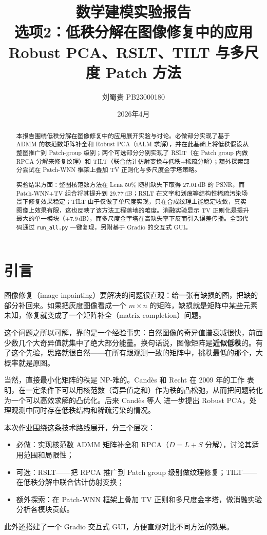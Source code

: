 \documentclass[10.5pt, a4paper]{article}
\title{%
    \vspace{-1cm}
    \textbf{数学建模实验报告} \\[0.3cm]
    \Large 选项2：低秩分解在图像修复中的应用 \\[0.2cm]
    \large Robust PCA、RSLT、TILT 与多尺度 Patch 方法
}
\author{刘蜀贵 \quad PB23000180}
\date{2026年4月}
\begin{document}
\maketitle

\begin{abstract}
本报告围绕低秩分解在图像修复中的应用展开实验与讨论。必做部分实现了基于 ADMM 的核范数矩阵补全和 Robust PCA（iALM 求解），并在此基础上将低秩假设从整图推广到 Patch-group 级别；两个可选部分分别实现了 RSLT（在 Patch group 内做 RPCA 分解来修复纹理）和 TILT（联合估计仿射变换与低秩+稀疏分解）；额外探索部分尝试在 Patch-WNN 框架上叠加 TV 正则化与多尺度金字塔策略。

实验结果方面：整图核范数方法在 Lena 50\% 随机缺失下取得 27.01\,dB 的 PSNR，而 Patch-WNN+TV 组合将其提升到 29.77\,dB；RSLT 在文字和划痕等结构性稀疏污染场景下修复效果稳定；TILT 由于仅做了单尺度实现，只在合成纹理上能稳定收敛，真实图像上效果有限，这也反映了该方法工程落地的难度。消融实验显示 TV 正则化是提升最大的单一模块（+7.9\,dB），而多尺度金字塔在高缺失率下反而引入误差传播。全部代码通过 \texttt{run\_all.py} 一键复现，另附基于 Gradio 的交互式 GUI。
\end{abstract}

\tableofcontents
\newpage

\section{引言}

图像修复（image inpainting）要解决的问题很直观：给一张有缺损的图，把缺的部分补回来。如果把灰度图像看成一个 $m\times n$ 的矩阵，缺损就是矩阵中某些元素未知，修复就变成了一个矩阵补全（matrix completion）问题。

这个问题之所以可解，靠的是一个经验事实：自然图像的奇异值谱衰减很快，前面少数几个大奇异值就集中了绝大部分能量。换句话说，图像矩阵是\textbf{近似低秩}的。有了这个先验，思路就很自然——在所有跟观测一致的矩阵中，挑秩最低的那个，大概率就是原图。

当然，直接最小化矩阵的秩是 NP-难的。Cand\`es 和 Recht 在 2009 年的工作 \cite{candes2009} 表明，在一定条件下可以用核范数（奇异值之和）作为秩的凸松弛，从而把问题转化为一个可以高效求解的凸优化。后来 Cand\`es 等人 \cite{candes2011rpca} 进一步提出 Robust PCA，处理观测中同时存在低秩结构和稀疏污染的情况。

本次作业围绕这条技术路线展开，分三个层次：
\begin{itemize}[leftmargin=*,itemsep=1pt]
    \item 必做：实现核范数 ADMM 矩阵补全和 RPCA（$D=L+S$ 分解），讨论其适用范围和局限性；
    \item 可选：RSLT——把 RPCA 推广到 Patch group 级别做纹理修复；TILT——在低秩分解中联合估计仿射变换；
    \item 额外探索：在 Patch-WNN 框架上叠加 TV 正则和多尺度金字塔，做消融实验分析各模块贡献。
\end{itemize}
此外还搭建了一个 Gradio 交互式 GUI，方便直观对比不同方法的效果。
\end{document}
